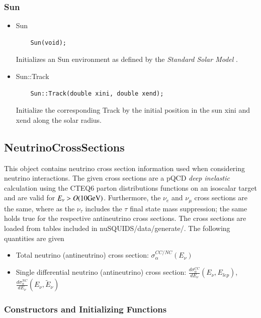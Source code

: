 \documentclass[3p,12pt,authoryear]{elsarticle}
\newcommand{\ttf}{\ttfamily}
\begin{document}
\subsubsection{{\ttf Sun}}

\begin{itemize}
\item {\ttf Sun}
  \begin{lstlisting}
    Sun(void);
  \end{lstlisting}
  Initializes an {\ttf Sun} environment as defined by the {\it Standard Solar Model} \citep{bahcall2005new}.
  \item {\ttf Sun::Track}
  \begin{lstlisting}
    Sun::Track(double xini, double xend);
  \end{lstlisting}
  Initialize the corresponding {\ttf Track} by the initial position in the sun {\ttf xini} and {\ttf xend} along the solar radius.
\end{itemize}

\subsection{NeutrinoCrossSections}

This object contains neutrino cross section information used when considering neutrino interactions. The given cross sections are a pQCD {\it deep inelastic} calculation using the CTEQ6 parton distributions functions on an isoscalar target and are valid for $E_\nu > O({\rm 10 GeV}) $. Furthermore, the $\nu_e$ and $\nu_\mu$ cross sections are the same, where as the $\nu_\tau$ includes the $\tau$ final state mass suppression; the same holds true for the respective antineutrino cross sections. The cross sections are loaded from tables included in {\ttfamily nuSQUIDS/data/generate/}. The following quantities are given

\begin{itemize}
\item Total neutrino (antineutrino) cross section: $\sigma^{CC/NC}_\alpha (E_\nu)$
\item Single differential neutrino (antineutrino) cross section: $\frac{d \sigma^{CC}_\alpha}{dE_\nu}(E_\nu,E_{lep})$, $\frac{d \sigma^{NC}_\alpha}{dE_\nu}(E_\nu,\tilde{E}_\nu)$
\end{itemize}

\subsubsection{Constructors and Initializing Functions}
\end{document}
